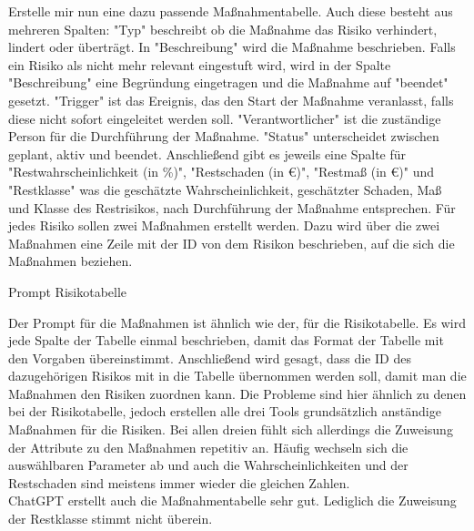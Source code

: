 \begin{prompt}[H]
    \begin{tcolorbox}[colback=gray!20, colframe=gray!20, boxrule=0pt, sharp corners] 
        Erstelle mir nun eine dazu passende Maßnahmentabelle. Auch diese besteht aus mehreren Spalten: "Typ" beschreibt 
        ob die Maßnahme das Risiko verhindert, lindert oder überträgt. In "Beschreibung" wird die Maßnahme beschrieben. 
        Falls ein Risiko als nicht mehr relevant eingestuft wird, wird in der Spalte "Beschreibung" eine Begründung 
        eingetragen und die Maßnahme auf "beendet" gesetzt. "Trigger" ist das Ereignis, das den Start der Maßnahme 
        veranlasst, falls diese nicht sofort eingeleitet werden soll. "Verantwortlicher" ist die zuständige Person für 
        die Durchführung der Maßnahme. "Status" unterscheidet zwischen geplant, aktiv und beendet. Anschließend gibt es 
        jeweils eine Spalte für "Restwahrscheinlichkeit (in \%)", "Restschaden (in €)", "Restmaß (in €)" und "Restklasse" 
        was die geschätzte Wahrscheinlichkeit, geschätzter Schaden, Maß und Klasse des Restrisikos, nach Durchführung der 
        Maßnahme entsprechen. Für jedes Risiko sollen zwei Maßnahmen erstellt werden. Dazu wird über die zwei Maßnahmen 
        eine Zeile mit der ID von dem Risikon beschrieben, auf die sich die Maßnahmen beziehen.
        \vfill
    \end{tcolorbox}
    \caption{Prompt Risikotabelle}
    \label{Prompt Risikotabelle}
\end{prompt}

Der Prompt für die Maßnahmen ist ähnlich wie der, für die Risikotabelle. Es wird jede Spalte der Tabelle einmal beschrieben,
damit das Format der Tabelle mit den Vorgaben übereinstimmt. Anschließend wird gesagt, dass die ID des dazugehörigen Risikos
mit in die Tabelle übernommen werden soll, damit man die Maßnahmen den Risiken zuordnen kann. Die Probleme sind hier 
ähnlich zu denen bei der Risikotabelle, jedoch erstellen alle drei Tools grundsätzlich anständige Maßnahmen für die Risiken.
Bei allen dreien fühlt sich allerdings die Zuweisung der Attribute zu den Maßnahmen repetitiv an. Häufig wechseln sich die 
auswählbaren Parameter ab und auch die Wahrscheinlichkeiten und der Restschaden sind meistens immer wieder die gleichen Zahlen.\\

ChatGPT erstellt auch die Maßnahmentabelle sehr gut. Lediglich die Zuweisung der Restklasse stimmt nicht überein.\\

